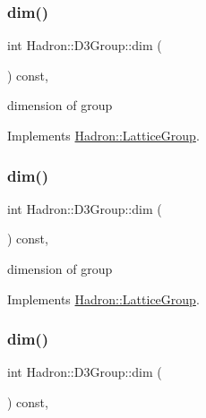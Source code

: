 \subsubsection{\texorpdfstring{dim()}{dim()}\hspace{0.1cm}{\footnotesize\ttfamily [1/3]}}
{\footnotesize\ttfamily int Hadron\+::\+D3\+Group\+::dim (\begin{DoxyParamCaption}{ }\end{DoxyParamCaption}) const\hspace{0.3cm}{\ttfamily [inline]}, {\ttfamily [virtual]}}

dimension of group 

Implements \mbox{\hyperlink{structHadron_1_1LatticeGroup_abd8415698323796ef6a8605796ee3bea}{Hadron\+::\+Lattice\+Group}}.

\mbox{\label{structHadron_1_1D3Group_a90114a92f0c05cdfd8ff56e33606d3c3}} 
\subsubsection{\texorpdfstring{dim()}{dim()}\hspace{0.1cm}{\footnotesize\ttfamily [2/3]}}
{\footnotesize\ttfamily int Hadron\+::\+D3\+Group\+::dim (\begin{DoxyParamCaption}{ }\end{DoxyParamCaption}) const\hspace{0.3cm}{\ttfamily [inline]}, {\ttfamily [virtual]}}

dimension of group 

Implements \mbox{\hyperlink{structHadron_1_1LatticeGroup_abd8415698323796ef6a8605796ee3bea}{Hadron\+::\+Lattice\+Group}}.

\mbox{\label{structHadron_1_1D3Group_a90114a92f0c05cdfd8ff56e33606d3c3}} 
\subsubsection{\texorpdfstring{dim()}{dim()}\hspace{0.1cm}{\footnotesize\ttfamily [3/3]}}
{\footnotesize\ttfamily int Hadron\+::\+D3\+Group\+::dim (\begin{DoxyParamCaption}{ }\end{DoxyParamCaption}) const\hspace{0.3cm}{\ttfamily [inline]}, {\ttfamily [virtual]}}


